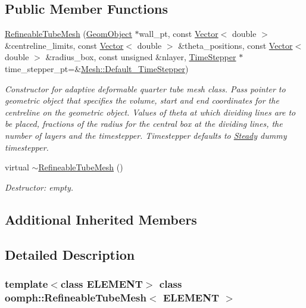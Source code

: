 \subsection*{Public Member Functions}
\begin{DoxyCompactItemize}
\item 
\hyperlink{classoomph_1_1RefineableTubeMesh_a0b8e2307c2d4594196f78a6278d9bbf7}{Refineable\+Tube\+Mesh} (\hyperlink{classoomph_1_1GeomObject}{Geom\+Object} $\ast$wall\+\_\+pt, const \hyperlink{classoomph_1_1Vector}{Vector}$<$ double $>$ \&centreline\+\_\+limits, const \hyperlink{classoomph_1_1Vector}{Vector}$<$ double $>$ \&theta\+\_\+positions, const \hyperlink{classoomph_1_1Vector}{Vector}$<$ double $>$ \&radius\+\_\+box, const unsigned \&nlayer, \hyperlink{classoomph_1_1TimeStepper}{Time\+Stepper} $\ast$time\+\_\+stepper\+\_\+pt=\&\hyperlink{classoomph_1_1Mesh_a12243d0fee2b1fcee729ee5a4777ea10}{Mesh\+::\+Default\+\_\+\+Time\+Stepper})
\begin{DoxyCompactList}\small\item\em Constructor for adaptive deformable quarter tube mesh class. Pass pointer to geometric object that specifies the volume, start and end coordinates for the centreline on the geometric object. Values of theta at which dividing lines are to be placed, fractions of the radius for the central box at the dividing lines, the number of layers and the timestepper. Timestepper defaults to \hyperlink{classoomph_1_1Steady}{Steady} dummy timestepper. \end{DoxyCompactList}\item 
virtual \hyperlink{classoomph_1_1RefineableTubeMesh_a743f3d17c3d5f0abe88ee1a7bda0b149}{$\sim$\+Refineable\+Tube\+Mesh} ()
\begin{DoxyCompactList}\small\item\em Destructor\+: empty. \end{DoxyCompactList}\end{DoxyCompactItemize}
\subsection*{Additional Inherited Members}


\subsection{Detailed Description}
\subsubsection*{template$<$class E\+L\+E\+M\+E\+NT$>$\newline
class oomph\+::\+Refineable\+Tube\+Mesh$<$ E\+L\+E\+M\+E\+N\+T $>$}

